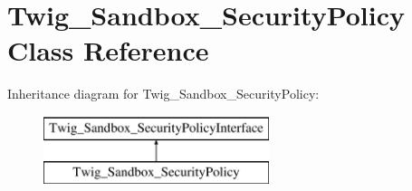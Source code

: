 \hypertarget{classTwig__Sandbox__SecurityPolicy}{}\section{Twig\+\_\+\+Sandbox\+\_\+\+Security\+Policy Class Reference}
\label{classTwig__Sandbox__SecurityPolicy}
Inheritance diagram for Twig\+\_\+\+Sandbox\+\_\+\+Security\+Policy\+:\begin{figure}[H]
\begin{center}
\leavevmode
\includegraphics[height=2.000000cm]{classTwig__Sandbox__SecurityPolicy}
\end{center}
\end{figure}
